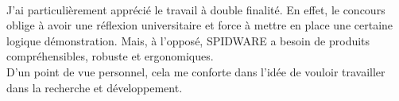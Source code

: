 	\paragraph*{}
		J'ai particulièrement apprécié le travail à double finalité. En effet, le concours oblige à avoir une réflexion universitaire et force à mettre en place une certaine logique démonstration. Mais, à l'opposé, SPIDWARE a besoin de produits compréhensibles, robuste et ergonomiques.\\
		D'un point de vue personnel, cela me conforte dans l'idée de vouloir travailler dans la recherche et développement.
		